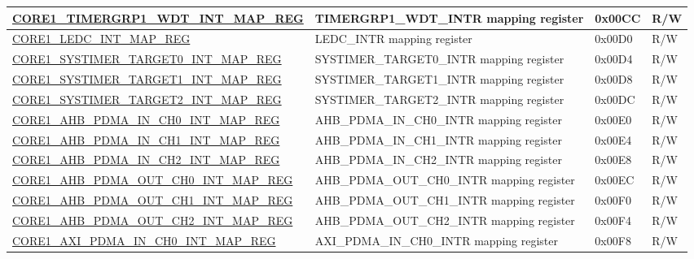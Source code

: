 \begin{longtable}{ | p{7.5cm} | p{7.2cm} | p{1.3cm} | p{1cm} | }
\hyperref[regdesc:CORE1TIMERGRP1WDTINTMAPREG]{CORE1\_TIMERGRP1\_WDT\_INT\_MAP\_REG} & TIMERGRP1\_WDT\_INTR mapping register & 0x00CC & R/W \\ \hline

\hyperref[regdesc:CORE1LEDCINTMAPREG]{CORE1\_LEDC\_INT\_MAP\_REG} & LEDC\_INTR mapping register & 0x00D0 & R/W \\ \hline

\hyperref[regdesc:CORE1SYSTIMERTARGET0INTMAPREG]{CORE1\_SYSTIMER\_TARGET0\_INT\_MAP\_REG} & SYSTIMER\_TARGET0\_INTR mapping register & 0x00D4 & R/W \\ \hline

\hyperref[regdesc:CORE1SYSTIMERTARGET1INTMAPREG]{CORE1\_SYSTIMER\_TARGET1\_INT\_MAP\_REG} & SYSTIMER\_TARGET1\_INTR mapping register & 0x00D8 & R/W \\ \hline

\hyperref[regdesc:CORE1SYSTIMERTARGET2INTMAPREG]{CORE1\_SYSTIMER\_TARGET2\_INT\_MAP\_REG} & SYSTIMER\_TARGET2\_INTR mapping register & 0x00DC & R/W \\ \hline

\hyperref[regdesc:CORE1AHBPDMAINCH0INTMAPREG]{CORE1\_AHB\_PDMA\_IN\_CH0\_INT\_MAP\_REG} & AHB\_PDMA\_IN\_CH0\_INTR mapping register & 0x00E0 & R/W \\ \hline

\hyperref[regdesc:CORE1AHBPDMAINCH1INTMAPREG]{CORE1\_AHB\_PDMA\_IN\_CH1\_INT\_MAP\_REG} & AHB\_PDMA\_IN\_CH1\_INTR mapping register & 0x00E4 & R/W \\ \hline

\hyperref[regdesc:CORE1AHBPDMAINCH2INTMAPREG]{CORE1\_AHB\_PDMA\_IN\_CH2\_INT\_MAP\_REG} & AHB\_PDMA\_IN\_CH2\_INTR mapping register & 0x00E8 & R/W \\ \hline

\hyperref[regdesc:CORE1AHBPDMAOUTCH0INTMAPREG]{CORE1\_AHB\_PDMA\_OUT\_CH0\_INT\_MAP\_REG} & AHB\_PDMA\_OUT\_CH0\_INTR mapping register & 0x00EC & R/W \\ \hline

\hyperref[regdesc:CORE1AHBPDMAOUTCH1INTMAPREG]{CORE1\_AHB\_PDMA\_OUT\_CH1\_INT\_MAP\_REG} & AHB\_PDMA\_OUT\_CH1\_INTR mapping register & 0x00F0 & R/W \\ \hline

\hyperref[regdesc:CORE1AHBPDMAOUTCH2INTMAPREG]{CORE1\_AHB\_PDMA\_OUT\_CH2\_INT\_MAP\_REG} & AHB\_PDMA\_OUT\_CH2\_INTR mapping register & 0x00F4 & R/W \\ \hline

\hyperref[regdesc:CORE1AXIPDMAINCH0INTMAPREG]{CORE1\_AXI\_PDMA\_IN\_CH0\_INT\_MAP\_REG} & AXI\_PDMA\_IN\_CH0\_INTR mapping register & 0x00F8 & R/W \\ \hline


\end{longtable}
